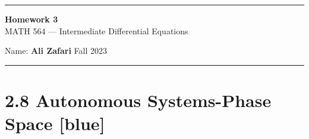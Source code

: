 \documentclass[12pt, letterpaper]{scrartcl}
\begin{document}
\begin{center}
    \hrule
    \vspace{0.4cm}
    { \textbf{{\large Homework 3}} \\ MATH 564 --- Intermediate Differential Equations}
\end{center}
{ Name: \textbf{Ali Zafari} \hspace{\fill} Fall 2023 } \newline\hrule

\section*{2.8 Autonomous Systems-Phase Space \xrfill[2pt]{3pt}[blue]}
\end{document}
